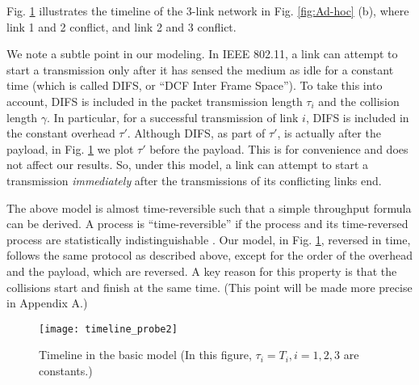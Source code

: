 \documentclass{IEEEtran}
\begin{document}
Fig. \ref{fig:basic-model} illustrates the timeline of the 3-link
network in Fig. \ref{fig:Ad-hoc} (b), where link 1 and 2 conflict,
and link 2 and 3 conflict.

We note a subtle point in our modeling. In IEEE 802.11, a link can
attempt to start a transmission only after it has sensed the medium
as idle for a constant time (which is called DIFS, or {}``DCF Inter
Frame Space''). To take this into account, DIFS is included in the
packet transmission length $\tau_{i}$ and the collision length $\gamma$.
In particular, for a successful transmission of link $i$, DIFS is
included in the constant overhead $\tau'$. Although DIFS, as part
of $\tau'$, is actually after the payload, in Fig. \ref{fig:basic-model}
we plot $\tau'$ before the payload. This is for convenience and does
not affect our results. So, under this model, a link can attempt to
start a transmission \emph{immediately} after the transmissions of
its conflicting links end.

The above model is almost time-reversible such that a simple throughput
formula can be derived. A process is {}``time-reversible'' if the
process and its time-reversed process are statistically indistinguishable
\cite{Kelly-book}. Our model, in Fig. \ref{fig:basic-model}, reversed
in time, follows the same protocol as described above, except for
the order of the overhead and the payload, which are reversed. A key
reason for this property is that the collisions start and finish at
the same time. (This point will be made more precise in Appendix A.)

\begin{figure}
\begin{centering}
\texttt{[image: timeline\_probe2]}
\par\end{centering}

\caption{\label{fig:basic-model}Timeline in the basic model (In this figure,
$\tau_{i}=T_{i},i=1,2,3$ are constants.)}



\end{figure}
\end{document}
